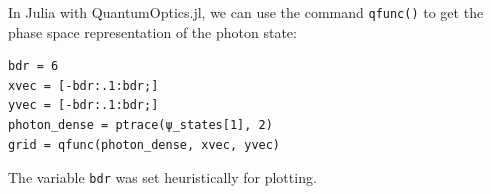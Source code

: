 \noindent In Julia with QuantumOptics.jl, we can use the command \texttt{qfunc()} to get the phase space representation of the photon state:

\begin{lstlisting}
bdr = 6
xvec = [-bdr:.1:bdr;]
yvec = [-bdr:.1:bdr;]
photon_dense = ptrace(ψ_states[1], 2)
grid = qfunc(photon_dense, xvec, yvec)
\end{lstlisting}The variable \texttt{bdr} was set heuristically for plotting.